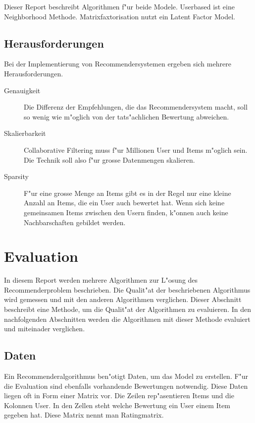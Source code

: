 \documentclass[a4paper, 12pt]{article}
\begin{document}
Dieser Report beschreibt Algorithmen f"ur beide Modele. Userbased ist eine Neighborhood Methode. Matrixfaxtorisation nutzt ein Latent Factor Model.

\subsection{Herausforderungen}
\label{sec:challenges}

Bei der Implementierung von Recommendersystemen ergeben sich mehrere Herausforderungen.

\begin{description}
\item[Genauigkeit] Die Differenz der Empfehlungen, die das Recommendersystem macht, soll so wenig wie m"oglich von der tats"achlichen Bewertung abweichen.
\item[Skalierbarkeit] 
Collaborative Filtering muss f"ur Millionen User und Items m"oglich sein. Die Technik soll also f"ur grosse Datenmengen skalieren.
\item[Sparsity] F"ur eine grosse Menge an Items gibt es in der Regel nur eine kleine Anzahl an Items, die ein User auch bewertet hat. Wenn sich keine gemeinsamen Items zwischen den Usern finden, k"onnen auch keine Nachbarschaften gebildet werden.
\end{description}

\section{Evaluation}
\label{sec:evaluation}

In diesem Report werden mehrere Algorithmen zur L"osung des Recommenderproblem beschrieben. Die Qualit"at der beschriebenen Algorithmus wird gemessen und mit den anderen Algorithmen verglichen. Dieser Abschnitt beschreibt eine Methode, um die Qualit"at der Algorithmen zu evaluieren. In den nachfolgenden Abschnitten werden die Algorithmen mit dieser Methode evaluiert und miteinader verglichen.

\subsection{Daten}
\label{sec:data}

Ein Recommenderalgorithmus ben"otigt Daten, um das Model zu erstellen. F"ur die Evaluation sind ebenfalls vorhandende Bewertungen notwendig. Diese Daten liegen oft in Form einer Matrix vor. Die Zeilen rep"asentieren Items und die Kolonnen User. In den Zellen steht welche Bewertung ein User einem Item gegeben hat. Diese Matrix nennt man Ratingmatrix.
\end{document}
